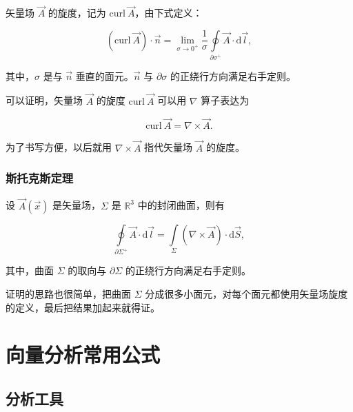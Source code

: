 矢量场 $\vec{A} $ 的旋度，记为 $\mathrm{curl}~\vec{A} $，由下式定义：

\begin{equation}
\left(\mathrm{curl}~\vec{A} \right)\cdot \vec{n}
=\lim_{\sigma\to 0^+} \frac{1 }{\sigma } \oint\limits_{\partial \sigma^+} \vec{A}\cdot\mathrm{d}\vec{l},
\end{equation}

其中，$\sigma $ 是与 $\vec{n} $ 垂直的面元。$\vec{n} $ 与 $\partial\sigma $ 的正绕行方向满足右手定则。

可以证明，矢量场 $\vec{A} $ 的旋度 $\mathrm{curl}~\vec{A} $ 可以用 $\nabla $ 算子表达为

\begin{equation}
\mathrm{curl}~\vec{A}
=\nabla \times \vec{A}.
\end{equation}

为了书写方便，以后就用 $\nabla \times \vec{A} $ 指代矢量场 $\vec{A} $ 的旋度。

\subsubsection{斯托克斯定理}

\begin{theorem}
设 $\vec{A}(\vec{x}) $ 是矢量场，$\Sigma $ 是 $\mathbb{R}^3 $ 中的封闭曲面，则有

\begin{equation}
\oint\limits_{\partial\Sigma^+}\vec{A}\cdot\mathrm{d}\vec{l}
=\int\limits_{\Sigma} \left(\nabla\times\vec{A}\right)\cdot\mathrm{d}\vec{S},
\end{equation}

其中，曲面 $\Sigma $ 的取向与 $\partial\Sigma $ 的正绕行方向满足右手定则。

\end{theorem}

证明的思路也很简单，把曲面 $\Sigma $ 分成很多小面元，对每个面元都使用矢量场旋度的定义，最后把结果加起来就得证。


\section{向量分析常用公式}

\subsection{分析工具}

